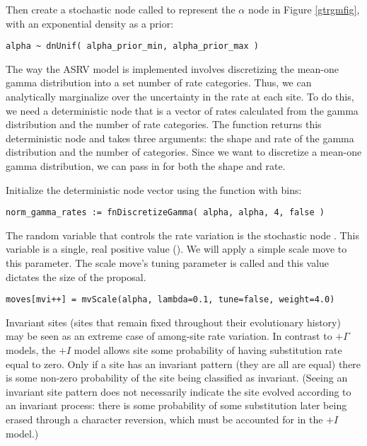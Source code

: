 Then create a stochastic node called  to represent the $\alpha$ node in Figure \ref{gtrgmfig}, with an exponential density as a prior:
{\tt\begin{snugshade*}
\begin{lstlisting}
alpha ~ dnUnif( alpha_prior_min, alpha_prior_max )
\end{lstlisting}
\end{snugshade*}}

The way the ASRV model is implemented involves discretizing the mean-one gamma distribution into a set number of rate categories. Thus, we can analytically marginalize over the uncertainty in the rate at each site. To do this, we need a deterministic node that is a vector of rates calculated from the gamma distribution and the number of rate categories. The  function returns this deterministic node and takes three arguments: the shape and rate of the gamma distribution and the number of categories. Since we want to discretize a mean-one gamma distribution, we can pass in  for both the shape and rate.

Initialize the  deterministic node vector using the   function with  bins:
{\tt \begin{snugshade*}
\begin{lstlisting}
norm_gamma_rates := fnDiscretizeGamma( alpha, alpha, 4, false )
\end{lstlisting}
\end{snugshade*}}

The random variable that controls the rate variation is the stochastic node . This variable is a single, real positive value (). 
We will apply a simple scale move to this parameter.
The scale move's tuning parameter is called  and this value dictates the size of the proposal.
{\tt \begin{snugshade*}
\begin{lstlisting}
moves[mvi++] = mvScale(alpha, lambda=0.1, tune=false, weight=4.0)
\end{lstlisting}
\end{snugshade*}}

Invariant sites (sites that remain fixed throughout their evolutionary history) may be seen as an extreme case of among-site rate variation.
In contrast to $+ \Gamma$ models, the $+I$ model allows site some probability of having substitution rate equal to zero.
Only if a site has an invariant pattern (they are all are equal) there is some non-zero probability of the site being classified as invariant.
(Seeing an invariant site pattern does not necessarily indicate the site evolved according to an invariant process: there is some probability of some substitution later being erased through a character reversion, which must be accounted for in the $+I$ model.)

